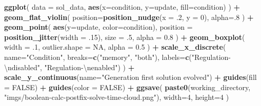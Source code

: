 \documentclass[
]{book}
\newenvironment{Shaded}{\begin{snugshade}}{\end{snugshade}}
\newcommand{\CharTok}[1]{\textcolor[rgb]{0.31,0.60,0.02}{#1}}
\newcommand{\DataTypeTok}[1]{\textcolor[rgb]{0.13,0.29,0.53}{#1}}
\newcommand{\DecValTok}[1]{\textcolor[rgb]{0.00,0.00,0.81}{#1}}
\newcommand{\FloatTok}[1]{\textcolor[rgb]{0.00,0.00,0.81}{#1}}
\newcommand{\KeywordTok}[1]{\textcolor[rgb]{0.13,0.29,0.53}{\textbf{#1}}}
\newcommand{\NormalTok}[1]{#1}
\newcommand{\OperatorTok}[1]{\textcolor[rgb]{0.81,0.36,0.00}{\textbf{#1}}}
\newcommand{\OtherTok}[1]{\textcolor[rgb]{0.56,0.35,0.01}{#1}}
\newcommand{\StringTok}[1]{\textcolor[rgb]{0.31,0.60,0.02}{#1}}
\begin{document}
\begin{Shaded}
\begin{Highlighting}[]
\KeywordTok{ggplot}\NormalTok{( }\DataTypeTok{data =}\NormalTok{ sol\_data, }\KeywordTok{aes}\NormalTok{(}\DataTypeTok{x=}\NormalTok{condition, }\DataTypeTok{y=}\NormalTok{update, }\DataTypeTok{fill=}\NormalTok{condition) ) }\OperatorTok{+}
\StringTok{  }\KeywordTok{geom\_flat\_violin}\NormalTok{(}
    \DataTypeTok{position=}\KeywordTok{position\_nudge}\NormalTok{(}\DataTypeTok{x =} \FloatTok{.2}\NormalTok{, }\DataTypeTok{y =} \DecValTok{0}\NormalTok{),}
    \DataTypeTok{alpha=}\NormalTok{.}\DecValTok{8}
\NormalTok{  ) }\OperatorTok{+}
\StringTok{  }\KeywordTok{geom\_point}\NormalTok{(}
    \KeywordTok{aes}\NormalTok{(}\DataTypeTok{y=}\NormalTok{update, }\DataTypeTok{color=}\NormalTok{condition),}
    \DataTypeTok{position =} \KeywordTok{position\_jitter}\NormalTok{(}\DataTypeTok{width =} \FloatTok{.15}\NormalTok{),}
    \DataTypeTok{size =} \FloatTok{.5}\NormalTok{,}
    \DataTypeTok{alpha =} \FloatTok{0.8}
\NormalTok{  ) }\OperatorTok{+}
\StringTok{  }\KeywordTok{geom\_boxplot}\NormalTok{(}
    \DataTypeTok{width =} \FloatTok{.1}\NormalTok{,}
    \DataTypeTok{outlier.shape =} \OtherTok{NA}\NormalTok{,}
    \DataTypeTok{alpha =} \FloatTok{0.5}
\NormalTok{  ) }\OperatorTok{+}
\StringTok{  }\KeywordTok{scale\_x\_discrete}\NormalTok{(}
    \DataTypeTok{name=}\StringTok{"Condition"}\NormalTok{,}
    \DataTypeTok{breaks=}\KeywordTok{c}\NormalTok{(}\StringTok{"memory"}\NormalTok{, }\StringTok{"both"}\NormalTok{),}
    \DataTypeTok{labels=}\KeywordTok{c}\NormalTok{(}\StringTok{"Regulation{-}}\CharTok{\textbackslash{}n}\StringTok{disabled"}\NormalTok{, }\StringTok{"Regulation{-}}\CharTok{\textbackslash{}n}\StringTok{enabled"}\NormalTok{)}
\NormalTok{  ) }\OperatorTok{+}
\StringTok{  }\KeywordTok{scale\_y\_continuous}\NormalTok{(}\DataTypeTok{name=}\StringTok{"Generation first solution evolved"}\NormalTok{) }\OperatorTok{+}
\StringTok{  }\KeywordTok{guides}\NormalTok{(}\DataTypeTok{fill =} \OtherTok{FALSE}\NormalTok{) }\OperatorTok{+}
\StringTok{  }\KeywordTok{guides}\NormalTok{(}\DataTypeTok{color =} \OtherTok{FALSE}\NormalTok{) }\OperatorTok{+}
\StringTok{  }\KeywordTok{ggsave}\NormalTok{(}
    \KeywordTok{paste0}\NormalTok{(working\_directory, }\StringTok{"imgs/boolean{-}calc{-}postfix{-}solve{-}time{-}cloud.png"}\NormalTok{),}
    \DataTypeTok{width=}\DecValTok{4}\NormalTok{,}
    \DataTypeTok{height=}\DecValTok{4}
\NormalTok{  )}
\end{Highlighting}
\end{Shaded}
\end{document}
